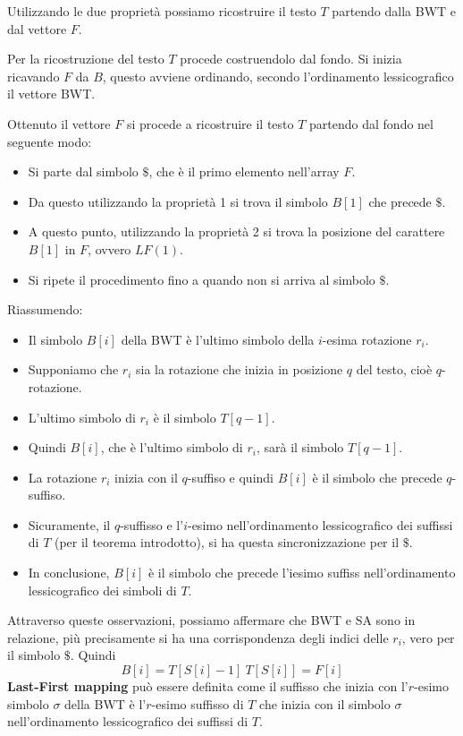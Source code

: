 Utilizzando le due proprietà possiamo ricostruire il testo $T$ partendo dalla BWT e
dal vettore $F$.
\begin{esempio} 
    Per la ricostruzione del testo $T$ procede costruendolo dal fondo. Si inizia
    ricavando $F$ da $B$, questo avviene ordinando, secondo l'ordinamento lessicografico
    il vettore BWT.

    Ottenuto il vettore $F$ si procede a ricostruire il testo $T$ partendo dal fondo
    nel seguente modo:
    \begin{itemize}
        \item Si parte dal simbolo $\$$, che è il primo elemento nell'array $F$.
        \item Da questo utilizzando la proprietà 1 si trova il simbolo $B[1]$ che
              precede $\$$.
        \item A questo punto, utilizzando la proprietà 2 si trova la posizione
              del carattere $B[1]$ in $F$, ovvero $LF(1)$.
        \item Si ripete il procedimento fino a quando non si arriva al simbolo $\$$.
    \end{itemize}
\end{esempio}
Riassumendo:
\begin{itemize}
    \item Il simbolo $B[i]$ della BWT è l'ultimo simbolo della $i$-esima rotazione
          $r_i$.
    \item Supponiamo che $r_i$ sia la rotazione che inizia in posizione $q$ del
          testo, cioè $q$-rotazione.
    \item L'ultimo simbolo di $r_i$ è il simbolo $T[q-1]$.
    \item Quindi $B[i]$, che è l'ultimo simbolo di $r_i$, sarà il simbolo $T[q-1]$.
    \item La rotazione $r_i$ inizia con il $q$-suffiso e quindi $B[i]$ è il simbolo
          che precede $q$-suffiso.
    \item Sicuramente, il $q$-suffisso e l'$i$-esimo nell'ordinamento lessicografico
          dei suffissi di $T$ (per il teorema introdotto), si ha questa sincronizzazione
          per il $\$$. %
    \item In conclusione, $B[i]$ è il simbolo che precede l'iesimo suffiss
          nell'ordinamento lessicografico dei simboli di $T$.
\end{itemize}
Attraverso queste osservazioni, possiamo affermare che BWT e SA sono in relazione,
più precisamente si ha una corrispondenza degli indici delle $r_i$, vero per il
simbolo $\$$. Quindi
\begin{equation}
    B[i] = T[S[i]-1] \ T[S[i]] = F[i]
\end{equation}
\textbf{Last-First mapping} può essere definita come il suffisso che inizia con
l'$r$-esimo simbolo $\sigma$ della BWT è l'$r$-esimo suffisso di $T$ che inizia
con il simbolo $\sigma$ nell'ordinamento lessicografico dei suffissi di $T$.

